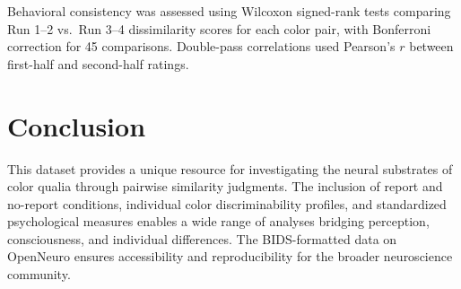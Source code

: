 \documentclass[11pt]{article}
\begin{document}
Behavioral consistency was assessed using Wilcoxon signed-rank tests comparing Run 1--2 vs.\ Run 3--4 dissimilarity scores for each color pair, with Bonferroni correction for 45 comparisons. Double-pass correlations used Pearson's $r$ between first-half and second-half ratings.

\section{Conclusion}

This dataset provides a unique resource for investigating the neural substrates of color qualia through pairwise similarity judgments. The inclusion of report and no-report conditions, individual color discriminability profiles, and standardized psychological measures enables a wide range of analyses bridging perception, consciousness, and individual differences. The BIDS-formatted data on OpenNeuro ensures accessibility and reproducibility for the broader neuroscience community.



\end{document}
